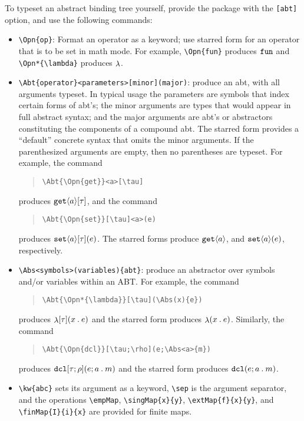 \documentclass[11pt]{article}
\begin{document}
To typeset an abstract binding tree yourself, provide the package with the \verb|[abt]| option, and use the following commands:
\begin{itemize}
  \item \verb|\Opn{op}|: Format an operator as a keyword; use starred form for an operator that is to be set in math mode.  For example, \verb|\Opn{fun}| produces $\Opn{fun}$ and \verb|\Opn*{\lambda}| produces $\Opn*{\lambda}$.
  \item \verb|\Abt{operator}<parameters>[minor](major)|: produce an abt, with all arguments typeset.  In typical usage the parameters are symbols that index certain forms of abt's; the minor arguments are types that would appear in full abstract syntax; and the major arguments are abt's or abstractors constituting the components of a compound abt.  The starred form provides a ``default'' concrete syntax that omits the minor arguments.  If the parenthesized arguments are empty, then no parentheses are typeset.  For example, the command
  \begin{quote}
\begin{verbatim}
\Abt{\Opn{get}}<a>[\tau]
\end{verbatim}
  \end{quote}
  produces $\Abt{\Opn{get}}<a>[\tau]$, and the command
  \begin{quote}
\begin{verbatim}
\Abt{\Opn{set}}[\tau]<a>(e)
\end{verbatim}
  \end{quote}
  produces $\Abt{\Opn{set}}<a>[\tau](e)$.  The starred forms produce $\Abt*{\Opn{get}}<a>[\tau]$, and $\Abt*{\Opn{set}}<a>[\tau](e)$, respectively.

  \item \verb|\Abs<symbols>(variables){abt}|: produce an abstractor over symbols and/or variables within an ABT.  For example, the command
  \begin{quote}
\begin{verbatim}
\Abt{\Opn*{\lambda}}[\tau](\Abs(x){e})
\end{verbatim}
  \end{quote}
  produces $\Abt{\Opn*{\lambda}}[\tau](\Abs(x){e})$ and the starred form produces $\Abt*{\Opn*{\lambda}}[\tau](\Abs(x){e})$.  Similarly, the command
  \begin{quote}
\begin{verbatim}
\Abt{\Opn{dcl}}[\tau;\rho](e;\Abs<a>{m})
\end{verbatim}
  \end{quote}
  produces $\Abt{\Opn{dcl}}[\tau;\rho](e;\Abs<a>{m})$ and the starred form produces $\Abt*{\Opn{dcl}}[\tau\,\rho](e;\Abs<a>{m})$.

  \item \verb|\kw{abc}| sets its argument as a keyword, \verb|\sep| is the argument separator, and the operations \verb|\empMap|, \verb|\singMap{x}{y}|, \verb|\extMap{f}{x}{y}|, and \verb|\finMap{I}{i}{x}| are provided for finite maps.
\end{itemize}
\end{document}
